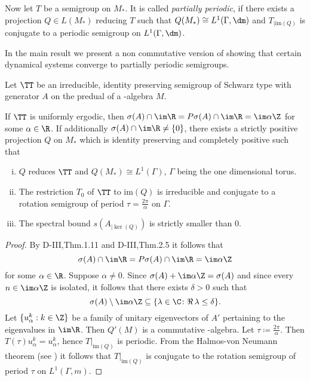 Now let $ T $  be a semigroup on $ M_{*} $.
It is called \textit{partially periodic}, if there exists a projection $ Q \in L(M_{*}) $  reducing $ T $  such that $ Q(M_{*}) \cong L^{1}(\Gamma,\dm) $  and $ T_{| \text{im}(Q)} $  is conjugate to a periodic semigroup on $ L^{1}(\Gamma,\dm) $.

In the main result we present a non commutative version of \citet{nagel:1984} showing that certain dynamical systems converge to partially periodic semigroups.
\begin{proposition}\label{prop:d4-3.10}
Let $ \TT $  be an irreducible, identity preserving semigroup of Schwarz type with generator $ A $  on the predual of a \WA-algebra $ M $.

If $ \TT $  is uniformly ergodic, then $ \sigma(A) \cap \im\R = P\sigma(A) \cap \im\R = \im\alpha\Z $  for some $ \alpha \in \R $.
If additionally $ \sigma(A) \cap \im\R \neq \{0\} $, there exists a strictly positive projection $ Q $  on $ M_{*} $  which is identity preserving and completely positive such that
\begin{enumerate}[(i)]
\item
$ Q $  reduces $ \TT $  and $ Q(M_{*}) \cong L^{1}(\Gamma) $, $ \Gamma $  being the one dimensional torus.

\item
The restriction $ T_{0} $  of $ \TT $  to $ \text{im}(Q) $  is irreducible and conjugate to a rotation semigroup of period $ \tau = \frac{2\pi}{\alpha} $  on $ \Gamma $.

\item
The spectral bound $ s(A_{| \ker(Q)}) $  is strictly smaller than $ 0 $.
\end{enumerate}
\end{proposition}
\begin{proof}
By D-III,Thm.1.11 and D-III,Thm.2.5 it follows that
\[
\sigma(A) \cap \im\R = P\sigma(A) \cap \im\R = \im\alpha\Z
\]
for some $ \alpha \in \R $.
Suppose $ \alpha \neq 0 $.
Since $ \sigma(A) + \im\alpha\Z = \sigma(A) $  and since every $ n \in \im\alpha\Z $  is isolated, it follows that there exists $ \delta > 0 $  such that
\[
\sigma(A) \setminus \im\alpha\Z \subseteq \{\lambda \in \C \colon  \Re\,\lambda \leq \delta\}.
\]
Let $ \{u_{\alpha}^{k}: k \in \Z\} $  be a family of unitary eigenvectors of $ A' $  pertaining to the eigenvalues in $ \im\R $.
Then $ Q'(M) $  is a commutative \WA-algebra.
Let $ \tau \coloneqq \frac{2\pi}{\alpha} $.
Then $ T(\tau)u_{\alpha}^{k} = u_{\alpha}^{k} $, hence $ T|_{\text{im}(Q)} $  is periodic.
From the Halmos-von Neumann theorem (see \citet[Thm. III.7.11]{schaefer:1974})
%
it follows that $ T|_{\text{im}(Q)} $  is conjugate to the rotation semigroup of period $ \tau $  on $ L^{1}(\Gamma,m) $.
\end{proof}
